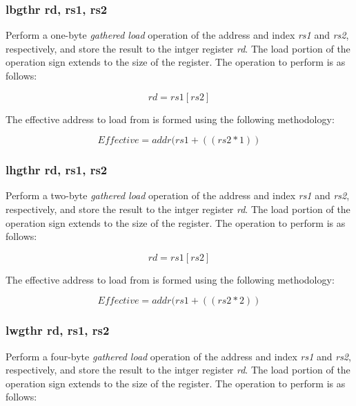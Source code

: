 \documentclass{article}
\begin{document}
\subsubsection{lbgthr rd, rs1, rs2}

Perform a one-byte \emph{gathered load} operation of the address and
index \emph{rs1} and \emph{rs2}, respectively, and store the result
to the intger register \emph{rd}.  The load portion of the operation
sign extends to the size of the register.  
The operation to perform is as follows:

\begin{equation}
rd = rs1[rs2]
\end{equation}

The effective address to load
from is formed using the following methodology:

\begin{equation}
Effective = addr(rs1 + ((rs2 * 1))
\end{equation}


\subsubsection{lhgthr rd, rs1, rs2}

Perform a two-byte \emph{gathered load} operation of the address and
index \emph{rs1} and \emph{rs2}, respectively, and store the result
to the intger register \emph{rd}.  The load portion of the operation
sign extends to the size of the register.
The operation to perform is as follows:

\begin{equation}
rd = rs1[rs2]
\end{equation}

The effective address to load
from is formed using the following methodology:

\begin{equation}
Effective = addr(rs1 + ((rs2 * 2))
\end{equation}


\subsubsection{lwgthr rd, rs1, rs2}

Perform a four-byte \emph{gathered load} operation of the address and
index \emph{rs1} and \emph{rs2}, respectively, and store the result
to the intger register \emph{rd}.  The load portion of the operation
sign extends to the size of the register.
The operation to perform is as follows:
\end{document}
